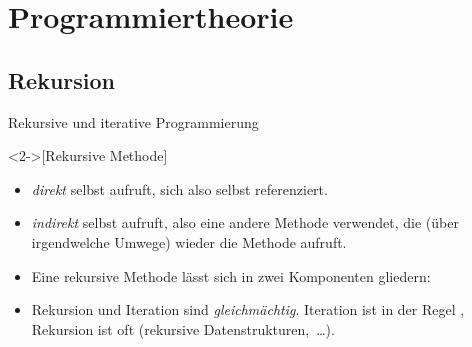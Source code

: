 \section{Programmiertheorie}
\subsection{Rekursion}
\begin{frame}{Rekursive und iterative Programmierung}
    \begin{definition}<2->[Rekursive Methode]
         \begin{itemize}
            \item<4-> \emph{direkt} selbst aufruft, sich also selbst referenziert.
            \item<5-> \emph{indirekt} selbst aufruft, also eine andere Methode verwendet, die (über irgendwelche Umwege) wieder die Methode aufruft.
        \end{itemize}
    \end{definition}
    \begin{itemize}
        \widei
        \item<6-> Eine rekursive Methode lässt sich in zwei Komponenten gliedern: 
        \item<9-> Rekursion und Iteration sind \textit{gleichmächtig}. Iteration ist in der Regel , Rekursion ist oft  (rekursive Datenstrukturen,~\ldots).
    \end{itemize}
\end{frame}

